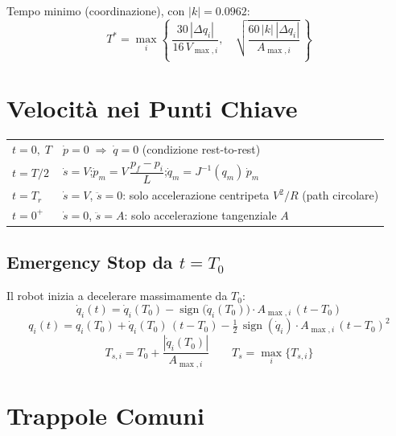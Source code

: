 \documentclass[10pt,a4paper]{article}
\newcommand{\dt}{\dot{s}}
\newcommand{\ddt}{\ddot{s}}
\begin{document}
Tempo minimo (coordinazione), con $|k| = 0.0962$:
\[
T^* = \max_i\!\left\{\,\frac{30\,|\Delta q_i|}{16\,V_{\max,i}},\quad
\sqrt{\frac{60\,|k|\,|\Delta q_i|}{A_{\max,i}}}\,\right\}
\]

\section{Velocit\`a nei Punti Chiave}

\begin{amberbox}
\begin{tabular}{@{}p{3.5cm}p{10cm}@{}}
$t = 0,\; T$ & $\dot{p} = 0 \;\Rightarrow\; \dot{q} = 0$ \quad (condizione rest-to-rest)\\[4pt]
$t = T/2$ & $\dt = V$;\quad $\dot{p}_m = V\,\dfrac{p_f - p_i}{L}$;\quad $\dot{q}_m = J^{-1}(q_m)\,\dot{p}_m$\\[6pt]
$t = T_r$ & $\dt = V$, $\ddt = 0$: solo accelerazione centripeta $V^2/R$ (path circolare)\\[4pt]
$t = 0^+$ & $\dt = 0$, $\ddt = A$: solo accelerazione tangenziale $A$\\
\end{tabular}
\end{amberbox}

\subsection{Emergency Stop da $t = T_0$}

Il robot inizia a decelerare massimamente da $T_0$:
\[
\dot{q}_i(t) = \dot{q}_i(T_0) - \operatorname{sign}\!\bigl(\dot{q}_i(T_0)\bigr)\cdot A_{\max,i}\,(t - T_0)
\]
\[
q_i(t) = q_i(T_0) + \dot{q}_i(T_0)\,(t-T_0) - \tfrac{1}{2}\,\operatorname{sign}(\dot{q}_i)\cdot A_{\max,i}\,(t-T_0)^2
\]
\[
T_{s,i} = T_0 + \frac{|\dot{q}_i(T_0)|}{A_{\max,i}} \qquad T_s = \max_i\{T_{s,i}\}
\]

\section{Trappole Comuni}
\end{document}
